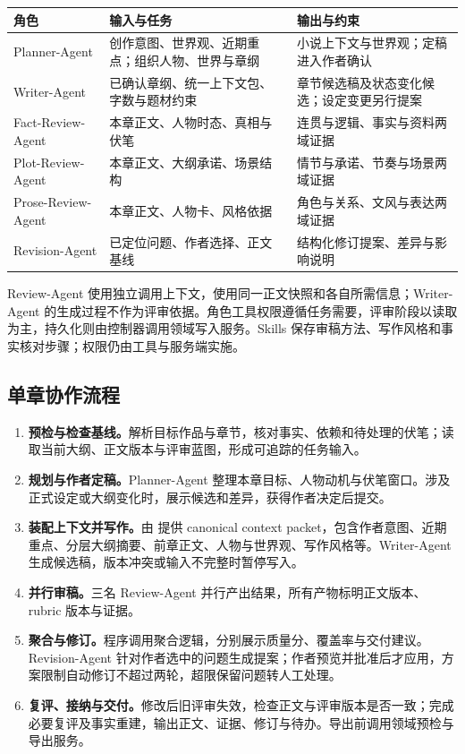 \noindent\begin{tabularx}{\textwidth}{@{}p{}YY@{}}
\toprule
角色 & 输入与任务 & 输出与约束 \\
\midrule
Planner-Agent & 创作意图、世界观、近期重点；组织人物、世界与章纲 & 小说上下文与世界观；定稿进入作者确认 \\
Writer-Agent & 已确认章纲、统一上下文包、字数与题材约束 & 章节候选稿及状态变化候选；设定变更另行提案 \\
Fact-Review-Agent & 本章正文、人物时态、真相与伏笔 & 连贯与逻辑、事实与资料两域证据 \\
Plot-Review-Agent & 本章正文、大纲承诺、场景结构 & 情节与承诺、节奏与场景两域证据 \\
Prose-Review-Agent & 本章正文、人物卡、风格依据 & 角色与关系、文风与表达两域证据 \\
Revision-Agent & 已定位问题、作者选择、正文基线 & 结构化修订提案、差异与影响说明 \\
\bottomrule
\end{tabularx}

Review-Agent 使用独立调用上下文，使用同一正文快照和各自所需信息；Writer-Agent 的生成过程不作为评审依据。角色工具权限遵循任务需要，评审阶段以读取为主，持久化则由控制器调用领域写入服务。Skills 保存审稿方法、写作风格和事实核对步骤；权限仍由工具与服务端实施。

\subsection{单章协作流程}

\begin{enumerate}
  \item \textbf{预检与检查基线。}解析目标作品与章节，核对事实、依赖和待处理的伏笔；读取当前大纲、正文版本与评审蓝图，形成可追踪的任务输入。
  \item \textbf{规划与作者定稿。}Planner-Agent 整理本章目标、人物动机与伏笔窗口。涉及正式设定或大纲变化时，展示候选和差异，获得作者决定后提交。
  \item \textbf{装配上下文并写作。}由  提供 canonical context packet，包含作者意图、近期重点、分层大纲摘要、前章正文、人物与世界观、写作风格等。Writer-Agent 生成候选稿，版本冲突或输入不完整时暂停写入。
  \item \textbf{并行审稿。}三名 Review-Agent 并行产出结果，所有产物标明正文版本、rubric 版本与证据。
  \item \textbf{聚合与修订。}程序调用聚合逻辑，分别展示质量分、覆盖率与交付建议。Revision-Agent 针对作者选中的问题生成提案；作者预览并批准后才应用，方案限制自动修订不超过两轮，超限保留问题转人工处理。
  \item \textbf{复评、接纳与交付。}修改后旧评审失效，检查正文与评审版本是否一致；完成必要复评及事实重建，输出正文、证据、修订与待办。导出前调用领域预检与导出服务。
\end{enumerate}

